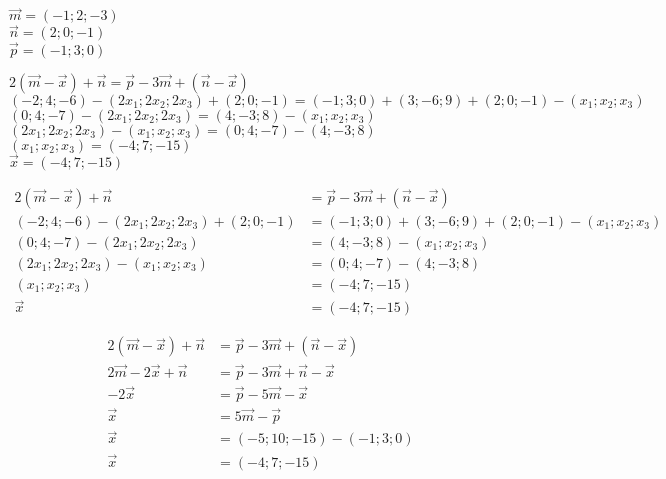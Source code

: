 \documentclass{article}
\begin{document}
	$\vec{m}=(-1;2;-3)$\\
	$\vec{n}=(2;0;-1)$\\
	$\vec{p}=(-1;3;0)$
	
	$2(\vec{m}-\vec{x})+\vec{n}=\vec{p}-3\vec{m}+(\vec{n}-\vec{x})$\\
	$(-2;4;-6)-(2x_1;2x_2;2x_3)+(2;0;-1)=
	(-1;3;0)+(3;-6;9)+(2;0;-1)-(x_1;x_2;x_3)$\\
	$(0;4;-7)-(2x_1;2x_2;2x_3)=(4;-3;8)-(x_1;x_2;x_3)$\\
	$(2x_1;2x_2;2x_3)-(x_1;x_2;x_3)=(0;4;-7)-(4;-3;8)$\\
	$(x_1;x_2;x_3)=(-4;7;-15)$\\
	$\vec{x}=(-4;7;-15)$
	
	\begin{align*}
		2(\vec{m}-\vec{x})+\vec{n} &= \vec{p}-3\vec{m}+(\vec{n}-\vec{x}) \\
		(-2;4;-6)-(2x_1;2x_2;2x_3)+(2;0;-1) &= (-1;3;0)+(3;-6;9)+(2;0;-1)-(x_1;x_2;x_3) \\
		(0;4;-7)-(2x_1;2x_2;2x_3) &= (4;-3;8)-(x_1;x_2;x_3) \\
		(2x_1;2x_2;2x_3)-(x_1;x_2;x_3) &= (0;4;-7)-(4;-3;8) \\
		(x_1;x_2;x_3) &= (-4;7;-15) \\
		\vec{x} &= (-4;7;-15)
	\end{align*}
	
	\begin{align*}
		2(\vec{m}-\vec{x})+\vec{n}&=\vec{p}-3\vec{m}+(\vec{n}-\vec{x})\\
		2\vec{m}-2\vec{x}+\vec{n}&=\vec{p}-3\vec{m}+\vec{n}-\vec{x}\\
		-2\vec{x}&=\vec{p}-5\vec{m}-\vec{x}\\
		\vec{x}&=5\vec{m}-\vec{p}\\
		\vec{x}&=(-5;10;-15)-(-1;3;0)\\
		\vec{x}&=(-4;7;-15)
	\end{align*}
\end{document}
